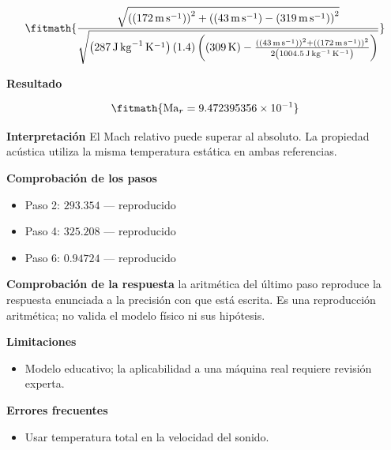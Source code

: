 \documentclass[10pt,openany]{book}
\begin{document}
\begin{tcolorbox}[title={Problema resuelto 3}, studiumworked, breakable]
\[
\fitmath{\frac{\sqrt{\left(\left(172\,\mathrm{m}\,\mathrm{s}^{-1}\right)\right)^{2} + \left(\left(43\,\mathrm{m}\,\mathrm{s}^{-1}\right) - \left(319\,\mathrm{m}\,\mathrm{s}^{-1}\right)\right)^{2}}}{\sqrt{\left(287\,\mathrm{J}\,\mathrm{kg}^{-1}\,\mathrm{K}^{-1}\right) \left(1.4\right) \left(\left(309\,\mathrm{K}\right) - \frac{\left(\left(43\,\mathrm{m}\,\mathrm{s}^{-1}\right)\right)^{2} + \left(\left(172\,\mathrm{m}\,\mathrm{s}^{-1}\right)\right)^{2}}{2 \left(1004.5\,\mathrm{J}\,\mathrm{kg}^{-1}\,\mathrm{K}^{-1}\right)}\right)}}}
\]

\noindent\textbf{Resultado}

\[
\fitmath{\mathrm{Ma}_r=9.472395356\times10^{-1}}
\]

\noindent\textbf{Interpretación}
El Mach relativo puede superar al absoluto. La propiedad acústica utiliza la misma temperatura estática en ambas referencias.

\noindent\textbf{Comprobación de los pasos}
\begin{itemize}
\item Paso 2: $293.354$ — reproducido
\item Paso 4: $325.208$ — reproducido
\item Paso 6: $0.94724$ — reproducido
\end{itemize}

\noindent\textbf{Comprobación de la respuesta} la aritmética del último paso reproduce la respuesta enunciada a la precisión con que está escrita. Es una reproducción aritmética; no valida el modelo físico ni sus hipótesis.

\noindent\textbf{Limitaciones}
\begin{itemize}
\item Modelo educativo; la aplicabilidad a una máquina real requiere revisión experta.
\end{itemize}

\noindent\textbf{Errores frecuentes}
\begin{itemize}
\item Usar temperatura total en la velocidad del sonido.
\end{itemize}
\end{tcolorbox}
\end{document}
